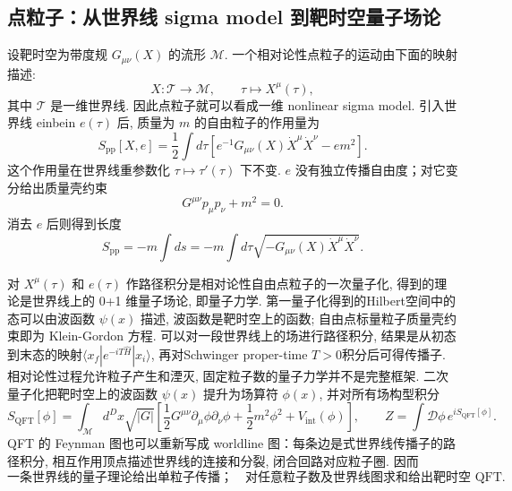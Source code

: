 \documentclass[10pt]{article}
\newcounter{ex}[section]\setcounter{ex}{0}
\numberwithin{equation}{section}
\begin{document}
\subsection{点粒子：从世界线 sigma model 到靶时空量子场论}

设靶时空为带度规 $G_{\mu\nu}(X)$ 的流形 $\mathcal M$. 一个相对论性点粒子的运动由下面的映射描述:
\begin{equation}
X:\mathcal{T}\longrightarrow\mathcal M,
\qquad
\tau\longmapsto X^\mu(\tau),
\end{equation}
其中 $\mathcal{T}$ 是一维世界线. 因此点粒子就可以看成一维 nonlinear sigma model. 引入世界线 einbein $e(\tau)$ 后, 质量为 $m$ 的自由粒子的作用量为
\begin{equation}
S_{\mathrm{pp}}[X,e]
=\frac12\int d\tau
\left[e^{-1}G_{\mu\nu}(X)\dot X^\mu\dot X^\nu-e m^2\right].
\label{eq:worldline-particle-action}
\end{equation}
这个作用量在世界线重参数化 $\tau\mapsto\tau'(\tau)$ 下不变. $e$ 没有独立传播自由度；对它变分给出质量壳约束
\begin{equation}
G^{\mu\nu}p_\mu p_\nu+m^2=0.
\end{equation}
消去 $e$ 后则得到长度
\begin{equation}
S_{\mathrm{pp}}=-m\int ds
=-m\int d\tau\sqrt{-G_{\mu\nu}(X)\dot X^\mu\dot X^\nu}.
\end{equation}

对 $X^\mu(\tau)$ 和 $e(\tau)$ 作路径积分是相对论性自由点粒子的一次量子化, 得到的理论是世界线上的 0+1 维量子场论, 即量子力学.
第一量子化得到的Hilbert空间中的态可以由波函数 $\psi(x)$ 描述, 波函数是靶时空上的函数; 自由点标量粒子质量壳约束即为 Klein-Gordon 方程.
可以对一段世界线上的场进行路径积分, 结果是从初态到末态的映射$\langle x_f|e^{-iT\widehat H}|x_i\rangle$, 再对Schwinger proper-time $T>0$积分后可得传播子.
相对论性过程允许粒子产生和湮灭, 固定粒子数的量子力学并不是完整框架. 二次量子化把靶时空上的波函数 $\psi(x)$ 提升为场算符 $\phi(x)$, 并对所有场构型积分
\begin{equation}
S_{\mathrm{QFT}}[\phi]
=\int_{\mathcal M}d^Dx\sqrt{|G|}
\left[
\frac12G^{\mu\nu}\partial_\mu\phi\partial_\nu\phi
+\frac12m^2\phi^2+V_{\mathrm{int}}(\phi)
\right],
\qquad
Z=\int\mathcal D\phi\,e^{iS_{\mathrm{QFT}}[\phi]}.
\end{equation}
QFT 的 Feynman 图也可以重新写成 worldline 图：每条边是式世界线传播子的路径积分, 相互作用顶点描述世界线的连接和分裂, 闭合回路对应粒子圈. 因而
\begin{equation}
\boxed{
\text{一条世界线的量子理论给出单粒子传播；}
\quad
\text{对任意粒子数及世界线图求和给出靶时空 QFT.}
}
\end{equation}
\end{document}
